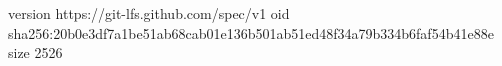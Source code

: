 version https://git-lfs.github.com/spec/v1
oid sha256:20b0e3df7a1be51ab68cab01e136b501ab51ed48f34a79b334b6faf54b41e88e
size 2526
